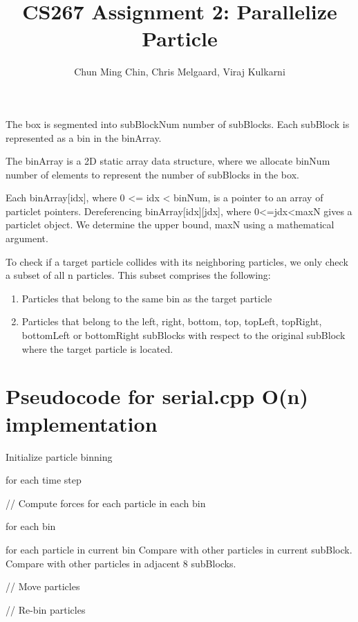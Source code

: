 \documentclass[11pt]{amsart}
\title{CS267 Assignment 2: Parallelize Particle}
\author{Chun Ming Chin, Chris Melgaard, Viraj Kulkarni }
\begin{document}
\maketitle



The box is segmented into subBlockNum number of subBlocks. Each subBlock is represented as a bin in the binArray.

The binArray is a 2D static array data structure, where we allocate binNum number of elements to represent the number of subBlocks in the box. 

Each binArray[idx], where 0 <= idx < binNum, is a pointer to an array of particlet pointers. Dereferencing binArray[idx][jdx], where 0<=jdx<maxN gives a particlet object. We determine the upper bound, maxN using a mathematical argument. 

To check if a target particle collides with its neighboring particles, we only check a subset of all n particles. This subset comprises the following: 
\begin{enumerate}
\item Particles that belong to the same bin as the target particle
\item Particles that belong to the left, right, bottom, top, topLeft, topRight, bottomLeft or bottomRight subBlocks with respect to the original subBlock where the target particle is located. 
\end{enumerate}


\section{Pseudocode for serial.cpp O(n) implementation}

Initialize particle binning

for each time step {

   // Compute forces for each particle in each bin
   
   for each bin {
   
      for each particle in current bin {
         Compare with other particles in current subBlock.
         Compare with other particles in adjacent 8 subBlocks.
      }    
   }
   
   // Move particles
   
   // Re-bin particles
   
}
\end{document}
